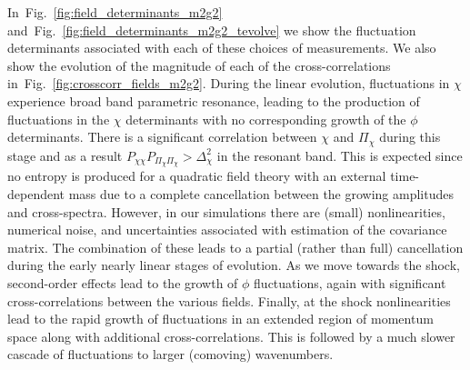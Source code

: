 \documentclass[11pt,a4paper]{article}
\newcommand{\figref}[1]{Fig.~\ref{#1}}
\begin{document}
In~\figref{fig:field_determinants_m2g2} and~\figref{fig:field_determinants_m2g2_tevolve} we show the fluctuation determinants associated with each of these choices of measurements.
We also show the evolution of the magnitude of each of the cross-correlations in~\figref{fig:crosscorr_fields_m2g2}.
During the linear evolution, fluctuations in $\chi$ experience broad band parametric resonance, leading to the production of fluctuations in the $\chi$ determinants with no corresponding growth of the $\phi$ determinants.
There is a significant correlation between $\chi$ and $\Pi_\chi$ during this stage and as a result $P_{\chi\chi}P_{\Pi_\chi\Pi_\chi} > \Delta^2_\chi$ in the resonant band.
This is expected since no entropy is produced for a quadratic field theory with an external time-dependent mass due to a complete cancellation between the growing amplitudes and cross-spectra. 
However, in our simulations there are (small) nonlinearities, numerical noise, and uncertainties associated with estimation of the covariance matrix.
The combination of these leads to a partial (rather than full) cancellation during the early nearly linear stages of evolution.
As we move towards the shock, second-order effects lead to the growth of $\phi$ fluctuations, again with significant cross-correlations between the various fields.
Finally, at the shock nonlinearities lead to the rapid growth of fluctuations in an extended region of momentum space along with additional cross-correlations.
This is followed by a much slower cascade of fluctuations to larger (comoving) wavenumbers.
\end{document}
